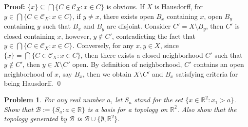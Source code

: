 \documentclass[12pt]{article}
\newtheorem{problem}{Problem}
\begin{document}
\textbf{Proof:} $\{x\}\subseteq \bigcap\{C\in \mathcal{C}_{X}: x\in C\}$ is obvious. If $X$ is Hausdorff, for $y\in \bigcap\{C\in \mathcal{C}_{X}: x\in C\}$, if $y\neq x$, there exists open $B_{x}$ containing $x$, open $B_{y}$ containing $y$ such that $B_{x}$ and $B_{y}$ are disjoint. Consider $C'=X\setminus B_{y}$, then $C'$ is closed containing $x$, however, $y\notin C'$, contradicting the fact that $y\in \bigcap\{C\in \mathcal{C}_{X}: x\in C\}$. Conversely, for any $x,y\in X$, since $\{x\}=\bigcap\{C\in\mathcal{C}_{X}: x\in C\}$, then there exists a closed neighborhood $C'$ such that $y\notin C'$, then $y\in X\setminus C'$ open. By definition of neighborhood, $C'$ contains an open neighborhood of $x$, say $B_{x}$, then we obtain $X\setminus C'$ and $B_{x}$ satisfying criteria for being Hausdorff. \qed 
\\
\begin{problem}
For any real number $a$, let $S_{a}$ stand for the set $\{x\in\mathbb{R}^{2}: x_{1}>a\}$. Show that $\mathcal{B}:=\{S_{a}: a\in\mathbb{R}\}$ is a basis for a topology on $\mathbb{R}^{2}$. Also show that the topology generated by $\mathcal{B}$ is $\mathcal{B}\cup\{\emptyset, \mathbb{R}^{2}\}$.
\end{problem}
\end{document}
